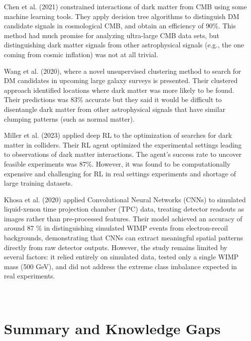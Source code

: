 Chen et al. (2021) constrained interactions of dark matter from CMB using some machine learning tools.\cite{chen2021} They apply decision tree algorithms to distinguish DM candidate signals in cosmological CMB, and obtain an efficiency of 90\%. This method had much promise for analyzing ultra-large CMB data sets, but distinguishing dark matter signals from other astrophysical signals (e.g., the one coming from cosmic inflation) was not at all trivial.

Wang et al. (2020), where a novel unsupervised clustering method to search for DM candidates in upcoming large galaxy surveys is presented.\cite{wang2020} Their clustered approach identified locations where dark matter was more likely to be found. Their predictions was 83\% accurate but they said it would be difficult to disentangle dark matter from other astrophysical signals that have similar clumping patterns (such as normal matter).

Miller et al. (2023) applied deep RL to the optimization of searches for dark matter in colliders.\cite{miller2023} Their RL agent optimized the experimental settings leading to observations of dark matter interactions. The agent's success rate to uncover feasible experiments was 87\%. However, it was found to be computationally expensive and challenging for RL in real settings experiments and shortage of large training datasets.

Khosa et al. (2020) applied Convolutional Neural Networks (CNNs) to simulated liquid-xenon time projection chamber (TPC) data, treating detector readouts as images rather than pre-processed features.\cite{khosa2020cnn}
Their model achieved an accuracy of around 87 \% in distinguishing simulated WIMP events from electron-recoil backgrounds, demonstrating that CNNs can extract meaningful spatial patterns directly from raw detector outputs.
However, the study remains limited by several factors: it relied entirely on simulated data, tested only a single WIMP mass (500 GeV), and did not address the extreme class imbalance expected in real experiments.
\\
\\
\\

\section{Summary and Knowledge Gaps}

